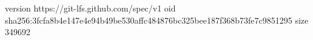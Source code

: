 version https://git-lfs.github.com/spec/v1
oid sha256:3fcfa8b4e147e4e94b49be530affc484876bc325bee187f368b73fe7c9851295
size 349692
